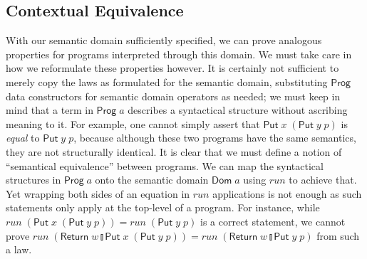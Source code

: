 \documentclass{llncs}
\newcommand{\Conid}[1]{\mathit{#1}}
\newcommand{\Varid}[1]{\mathit{#1}}
\let\Varid\mathit
\let\Conid\mathsf
\begin{document}
\subsection{Contextual Equivalence}
\label{subsec:contextual-equivalence}
With our semantic domain sufficiently specified, we can prove analogous
properties for programs interpreted through this domain.
We must take care in how we reformulate these properties however.
It is certainly not sufficient to merely copy the laws as formulated for the
semantic domain, substituting \ensuremath{\Conid{Prog}} data constructors for semantic domain
operators as needed; we must keep in mind that a term in \ensuremath{\Conid{Prog}\;\Varid{a}} describes a
syntactical structure without ascribing meaning to it.
For example, one cannot simply assert that \ensuremath{\Conid{Put}\;\Varid{x}\;(\Conid{Put}\;\Varid{y}\;\Varid{p})} is \emph{equal} to
\ensuremath{\Conid{Put}\;\Varid{y}\;\Varid{p}}, because although these two programs have the same semantics, they
are not structurally identical.
It is clear that we must define a notion of ``semantical equivalence'' between
programs.
We can map the syntactical structures in \ensuremath{\Conid{Prog}\;\Varid{a}} onto the semantic domain
\ensuremath{\Conid{Dom}\;\Varid{a}} using \ensuremath{\Varid{run}} to achieve that.
Yet wrapping both sides of an equation in \ensuremath{\Varid{run}} applications
is not enough as such statements only apply at the top-level of a program.
For instance, while \ensuremath{\Varid{run}\;(\Conid{Put}\;\Varid{x}\;(\Conid{Put}\;\Varid{y}\;\Varid{p}))\mathrel{=}\Varid{run}\;(\Conid{Put}\;\Varid{y}\;\Varid{p})} is a correct statement,
we cannot prove
\ensuremath{\Varid{run}\;(\Conid{Return}\;\Varid{w}\mathbin{\talloblong}\Conid{Put}\;\Varid{x}\;(\Conid{Put}\;\Varid{y}\;\Varid{p}))\mathrel{=}\Varid{run}\;(\Conid{Return}\;\Varid{w}\mathbin{\talloblong}\Conid{Put}\;\Varid{y}\;\Varid{p})}
from such a law.
\end{document}

